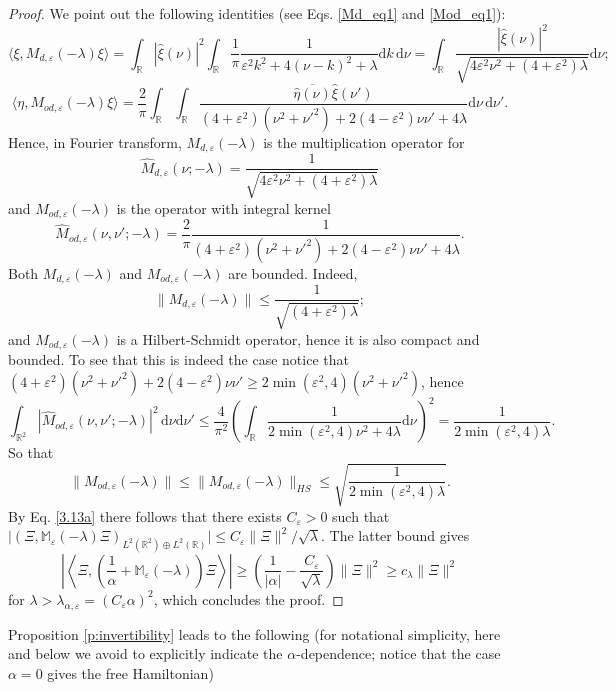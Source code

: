 \documentclass[a4paper,11pt,reqno]{amsart}
\theoremstyle{definition}
\numberwithin{equation}{section}
\newcommand{\RE}{\mathbb R}
\newcommand{\Mb}{\mathbb M}
\newcommand{\ve}{\varepsilon}
\renewcommand{\d}{\mathrm{d}}
\begin{document}
\begin{proof}
We point out the following identities (see Eqs. \eqref{Md_eq1} and \eqref{Mod_eq1}): 
\begin{equation*}
\langle\xi, M_{d,\ve}(-\lambda) \xi\rangle = \int_\RE |\hat \xi(\nu)|^2 \int_\RE \frac1\pi \frac{1}{\ve^2 k^2+4(\nu-k)^2+\lambda}\d k \,\d\nu  =\int_{\RE} \frac{|\hat \xi (\nu)|^2}{\sqrt{4\ve^2 \nu^2+(4+\ve^2)\lambda}}\d\nu;
\end{equation*}
\begin{equation*}
\langle\eta, M_{od,\ve}(-\lambda) \xi\rangle = 
\frac{2}{\pi} \int_{\RE}\int_{\RE} \frac{ \overline{\hat \eta (\nu)} \hat \xi (\nu')  }{(4+\ve^2)( \nu^2+{\nu'}^2)+2(4-\ve^2)\nu\nu' + 4\lambda}\d\nu\, \d\nu' .
\end{equation*}
Hence, in Fourier transform, $M_{d,\ve}(-\lambda)$ is the multiplication operator for 
\begin{equation}\label{Md-Fou}
\hat M_{d,\ve}(\nu;-\lambda)  =  \frac{1}{\sqrt{4\ve^2 \nu^2+(4+\ve^2)\lambda}}
\end{equation}
and $ M_{od,\ve}(-\lambda)$ is the operator with integral kernel 
\begin{equation*}%
 \hat M_{od,\ve}(\nu, \nu';-\lambda) = 
\frac{2}{\pi} \frac{ 1}{(4+\ve^2)( \nu^2+{\nu'}^2)+2(4-\ve^2)\nu\nu' + 4\lambda} .
\end{equation*}
Both $M_{d,\ve}(-\lambda)$ and $ M_{od,\ve}(-\lambda)$ are bounded. Indeed,
\[
\|M_{d,\ve}(-\lambda)\| \leq  \frac{1}{\sqrt{(4+\ve^2)\lambda}};
\]
and  $M_{od,\ve}(-\lambda)$ is a Hilbert-Schmidt operator, hence it is also compact and bounded. To see that this is indeed the case notice that $(4+\ve^2)( \nu^2+{\nu'}^2)+2(4-\ve^2)\nu\nu'  \geq 2 \min(\ve^2,4)( \nu^2+{\nu'}^2) $, hence    
    \[
    \int_{\RE^2} |\hat M_{od,\ve}(\nu,\nu';-\lambda)|^2 \, \d\nu \d\nu' \leq \frac{4}{\pi^2} \left( \int_\RE \frac{1}{2\min(\ve^2,4) \nu^2 +4\lambda} \d\nu \right)^2 = \frac{1}{2\min(\ve^2,4) \lambda}.
    \]
So that 
\[
\|M_{od,\ve}(-\lambda)\| \leq \|M_{od,\ve}(-\lambda)\|_{HS}
\leq \sqrt{\frac{1}{2\min(\ve^2,4) \lambda}}.
\]
By Eq. \eqref{3.13a} there follows that   there exists $C_\ve>0$ such that    $\big|(\Xi, \Mb_{\ve}(-\lambda)\Xi)_{L^2(\RE^2)\oplus L^2(\RE)} \big| \leq C_\ve \|\Xi\|^2/\sqrt\lambda$. The latter bound gives 
\[
\left|\left\langle\Xi, \left(\frac1\alpha   + \Mb_{\ve}(-\lambda)\right)\Xi\right\rangle \right|\geq \left(\frac1{|\alpha |}  - \frac{C_\ve}{\sqrt{\lambda}}\right) \|\Xi\|^2 \geq c_\lambda \|\Xi\|^2 
\]
for $\lambda>\lambda_{\alpha,\ve}  =(C_\ve\alpha )^2 $, which concludes the proof. 
\end{proof}
Proposition \ref{p:invertibility} leads to the following (for notational simplicity, here and below we avoid to explicitly indicate the $\alpha$-dependence; notice that the case $\alpha =0$ gives the free Hamiltonian)
\end{document}
